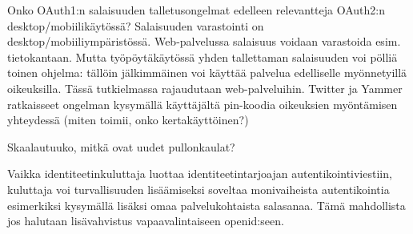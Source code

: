 \documentclass[finnish,gradu]{tktltiki}
\begin{document}
  Onko OAuth1:n salaisuuden talletusongelmat edelleen relevantteja OAuth2:n desktop/mobiilikäytössä?
  Salaisuuden varastointi on desktop/mobiiliympäristössä. Web-palvelussa salaisuus voidaan varastoida esim. tietokantaan. Mutta työpöytäkäytössä yhden tallettaman salaisuuden voi pölliä toinen ohjelma: tällöin jälkimmäinen voi käyttää palvelua edelliselle myönnetyillä oikeuksilla. Tässä tutkielmassa rajaudutaan web-palveluihin. Twitter ja Yammer ratkaisseet ongelman kysymällä käyttäjältä pin-koodia oikeuksien myöntämisen yhteydessä (miten toimii, onko kertakäyttöinen?) %

  Skaalautuuko, mitkä ovat uudet pullonkaulat?


  Vaikka identiteetinkuluttaja luottaa identiteetintarjoajan autentikointiviestiin, kuluttaja voi turvallisuuden lisäämiseksi soveltaa monivaiheista autentikointia esimerkiksi kysymällä lisäksi omaa palvelukohtaista salasanaa. Tämä mahdollista jos halutaan lisävahvistus vapaavalintaiseen openid:seen.




\end{document}
